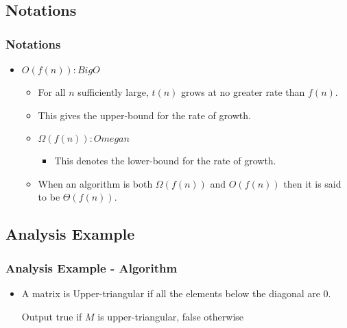 \documentclass{beamer}
\begin{document}
\subsection{Notations}
\begin{frame}
\frametitle{Notations}
\begin{itemize}
\item $O(f(n)): Big O$
\begin{itemize}
\item For all $n$ sufficiently large, $t(n)$ grows at no greater rate than $f(n)$.
\item This gives the {\color{red} upper-bound} for the rate of growth.
\end{itemize}
\begin{itemize}
\item $\Omega(f(n)): Omega n$
\begin{itemize}
\item This denotes the {\color{green} lower-bound} for the rate of growth.
\end{itemize}
\item When an algorithm is both $\Omega(f(n))$ and $O(f(n))$ then it is said to be $\Theta(f(n))$.
\end{itemize}
\end{itemize}
\end{frame}
\subsection{Analysis Example}
\begin{frame}
\frametitle{Analysis Example - Algorithm}
\begin{itemize}
\item A matrix is {\color{green} Upper-triangular} if all the elements below the diagonal are 0.
\begin{algorithm}[H]
  \caption{Output true if $M$ is upper-triangular, false otherwise}
  \begin{algorithmic}[1]
    \Statex
    				\State{}
    			\EndIf
    		\EndFor
    	\EndFor
    	\State {}
    \EndFunction
  \end{algorithmic}
\end{algorithm}
\end{itemize}
\end{frame}
\end{document}
